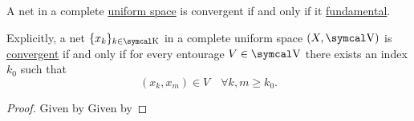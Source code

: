 \begin{theorem}\label{thm:cauchys_net_convergence_criterion}
  A net in a complete \hyperref[def:complete_uniform_space]{uniform space} is convergent if and only if it \hyperref[def:fundamental_net]{fundamental}.

  Explicitly, a net \( \{ x_k \}_{k \in \CK} \) in a complete uniform space \( (X, \CV) \) is \hyperref[def:net_convergence/limit]{convergent} if and only if for every entourage \( V \in \CV \) there exists an index \( k_0 \) such that
  \begin{equation*}
    (x_k, x_m) \in V \quad\forall k, m \geq k_0.
  \end{equation*}
\end{theorem}
\begin{proof}
  \Sufficiency Given by 
  \Necessity Given by 
\end{proof}
